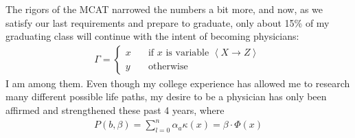 \documentclass[final]{clv2025}
\begin{document}
The rigors of the MCAT narrowed the numbers a bit more, and now, as we satisfy our last requirements and prepare to graduate, only about 15\% of my graduating class will continue with the intent of becoming physicians:
\begin{align}
\Gamma=\left\{
\begin{array}{ll}
x&\quad \text{if $x$ is variable $\left<X\rightarrow Z\right>$}\\
y&\quad \text{otherwise}
\end{array}
\right.
\nonumber
\end{align}
I am among them. Even though my college experience has allowed me to research many different possible life paths, my desire to be a physician has only been affirmed and strengthened these past 4 years, where
\begin{align}
P(b,\beta)
=\sum_{l=0}^n \alpha_a \kappa(x) = \beta\cdot \Phi(x)
\end{align}
\end{document}
